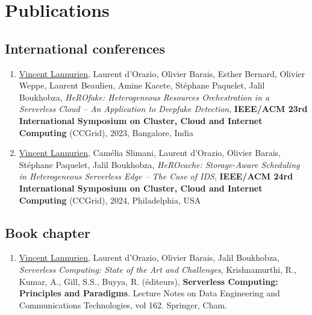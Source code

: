 \chapter*{Publications}

\section*{International conferences}

\begin{enumerate}
    \item \underline{Vincent Lannurien}, Laurent d'Orazio, Olivier Barais, Esther Bernard, Olivier Weppe, Laurent Beaulieu, Amine Kacete, Stéphane Paquelet, Jalil Boukhobza, \textit{{\NoAutoSpacing HeROfake:} Heterogeneous Resources Orchestration in a Serverless Cloud -- An Application to Deepfake Detection}, \textbf{IEEE/ACM 23rd International Symposium on Cluster, Cloud and Internet Computing} (CCGrid), 2023, Bangalore, India
    \item \underline{Vincent Lannurien}, Camélia Slimani, Laurent d'Orazio, Olivier Barais, Stéphane Paquelet, Jalil Boukhobza, \textit{{\NoAutoSpacing HeROcache:} Storage-Aware Scheduling in Heterogeneous Serverless Edge – The Case of IDS}, \textbf{IEEE/ACM 24rd International Symposium on Cluster, Cloud and Internet Computing} (CCGrid), 2024, Philadelphia, USA
\end{enumerate}

\section*{Book chapter}

\begin{enumerate}
    \item \underline{Vincent Lannurien}, Laurent d'Orazio, Olivier Barais, Jalil Boukhobza, \textit{{\NoAutoSpacing Serverless Computing:} State of the Art and Challenges}, Krishnamurthi, R., Kumar, A., Gill, S.S., Buyya, R. (éditeurs), \textbf{{\NoAutoSpacing Serverless Computing:} Principles and Paradigms}. Lecture Notes on Data Engineering and Communications Technologies, vol 162. Springer, Cham.
\end{enumerate}
